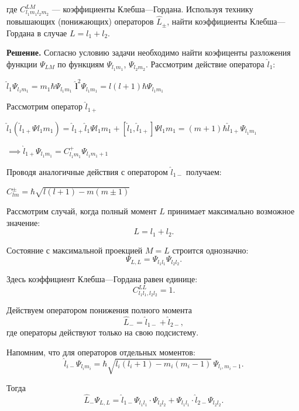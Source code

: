 \documentclass[a4paper, 12pt]{article}
\begin{document}
	где \( C_{l_1 m_1 l_2 m_2}^{LM} \) — коэффициенты Клебша—Гордана. Используя технику повышающих (понижающих) операторов \( \hat{L}_{\pm} \), найти коэффициенты Клебша—Гордана в случае \( L = l_1 + l_2 \).
	
	\quad \textbf{Решение.} Согласно условию задачи необходимо найти коэфиценты разложения функции $\Psi_{LM}$ по функциям $\Psi_{l_1 m_1}$, $\Psi_{l_2 m_2}$. Рассмотрим действие оператора $\hat{l}_1$:
	
	\begin{center}
		$\hat{l}_1 \Psi_{l_1 m_1} = m_1\hbar\Psi_{l_1 m_1}$ \quad $\hat{\mathbf{l}}^2 \Psi_{l_1 m_1} = l(l+1)\hbar \Psi_{l_1 m_1}$
	\end{center}
	
	\quad Рассмотрим оператор $\hat{l}_{1+}$
	
	\begin{center}
		$\hat{l}_{1} \left(\hat{l}_{1+} \Psi{l_1 m_1}\right) = \hat{l}_{1+} \hat{l}_1 \Psi{l_1 m_1} + \left[\hat{l}_1, \hat{l}_{1+}\right]\Psi{l_1 m_1} = (m+1)\hbar \hat{l}_{1+}\Psi_{l_1 m_1}$
		
		$\implies \hat{l}_{1+}\Psi_{l_1 m_1} = C_{l_1 m_1}^{+} \Psi_{l_1 m_1 + 1} $
	\end{center}
	
	\quad Проводя аналогичные действия с оператором $\hat{l}_{1-}$ получаем:
	
	\begin{center}
		$C_{l m}^{\pm} = \hbar\sqrt{l(l+1) - m(m\pm 1)} $
	\end{center}
	
	\quad Рассмотрим случай, когда полный момент \( L \) принимает максимально возможное значение:
	\[
	L = l_1 + l_2.
	\]
	
	\quad Состояние с максимальной проекцией \( M = L \) строится однозначно:
	\[
	\Psi_{L, L} = \Psi_{l_1 l_1} \Psi_{l_2 l_2}.
	\]
	
	\quad Здесь коэффициент Клебша—Гордана равен единице:
	\[
	C_{l_1 l_1, l_2 l_2}^{L L} = 1.
	\]
	
	\quad Действуем оператором понижения полного момента 
	\[
	\hat{L}_- = \hat{l}_{1-} + \hat{l}_{2-},
	\]
	где операторы действуют только на свою подсистему.
	
	\quad Напомним, что для операторов отдельных моментов:
	\[
	\hat{l}_{i-} \Psi_{l_i m_i} = \hbar\sqrt{l_i(l_i+1) - m_i(m_i-1)} \, \Psi_{l_i, m_i-1}.
	\]
	
	\quad Тогда
	\[
	\hat{L}_- \Psi_{L, L} 
	= \hat{l}_{1-} \Psi_{l_1 l_1} \cdot \Psi_{l_2 l_2} 
	+ \Psi_{l_1 l_1} \cdot \hat{l}_{2-} \Psi_{l_2 l_2}.
	\]
	
\end{document}
